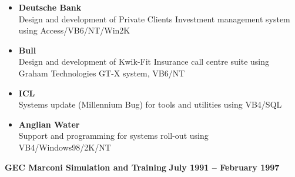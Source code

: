 \documentclass[10pt]{article}
\newenvironment{outerlist}[1][\enskip\textbullet]%
        {\begin{itemize}[#1]}{\end{itemize}%
         \vspace{-.6\baselineskip}}
\newcommand{\blankline}{\quad\pagebreak[2]}
\begin{document}
\begin{outerlist}
\begin{outerlist}
\item \textbf{Deutsche Bank} \\ %
	Design and development of Private Clients Investment management system using Access/VB6/NT/Win2K
\item \textbf{Bull} \\ %
	Design and development of Kwik-Fit Insurance call centre suite using Graham Technologies GT-X system, VB6/NT
\item \textbf{ICL} \\ %
	Systems update (Millennium Bug) for tools and utilities using VB4/SQL
\item \textbf{Anglian Water} \\ %
	Support and programming for systems roll-out using VB4/Windows98/2K/NT

\end{outerlist}
\end{outerlist}


\blankline

\textbf{GEC Marconi Simulation and Training}        \hfill \textbf{July 1991 -- February 1997}
\end{document}
